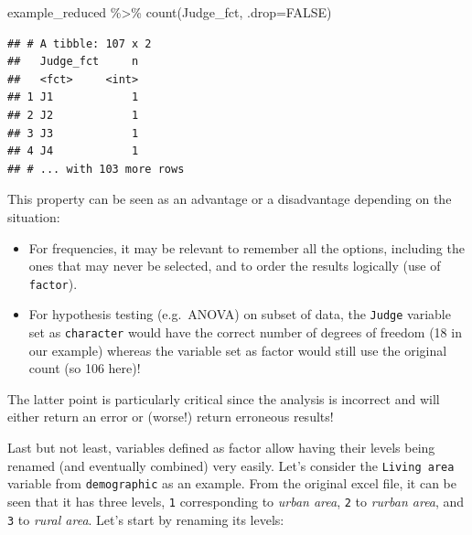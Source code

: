 \documentclass[
]{krantz}
\makeatletter
\newenvironment{Shaded}{\begin{snugshade}}{\end{snugshade}}
\newcommand{\AttributeTok}[1]{\textcolor[rgb]{0.61,0.61,0.61}{#1}}
\newcommand{\ConstantTok}[1]{\textcolor[rgb]{0,0,0}{#1}}
\newcommand{\DecValTok}[1]{\textcolor[rgb]{0.06,0.06,0.06}{#1}}
\newcommand{\FunctionTok}[1]{\textcolor[rgb]{0,0,0}{#1}}
\newcommand{\NormalTok}[1]{#1}
\newcommand{\OtherTok}[1]{\textcolor[rgb]{0.37,0.37,0.37}{#1}}
\newcommand{\SpecialCharTok}[1]{\textcolor[rgb]{0,0,0}{#1}}
\newcommand{\StringTok}[1]{\textcolor[rgb]{0.5,0.5,0.5}{#1}}
\providecommand{\tightlist}{%
  \setlength{\itemsep}{0pt}\setlength{\parskip}{0pt}}
\newenvironment{kframe}{%
\medskip{}
\setlength{\fboxsep}{.8em}
 \def\at@end@of@kframe{}%
 \ifinner\ifhmode%
  \def\at@end@of@kframe{\end{minipage}}%
  \begin{minipage}{\columnwidth}%
 \fi\fi%
 \def\FrameCommand##1{\hskip\@totalleftmargin \hskip-\fboxsep
 \colorbox{shadecolor}{##1}\hskip-\fboxsep
     \hskip-\linewidth \hskip-\@totalleftmargin \hskip\columnwidth}%
 \MakeFramed {\advance\hsize-\width
   \@totalleftmargin\z@ \linewidth\hsize
   \@setminipage}}%
 {\par\unskip\endMakeFramed%
 \at@end@of@kframe}
\renewenvironment{Shaded}{\begin{kframe}}{\end{kframe}}
\makeatother
\begin{document}
\begin{Shaded}
\begin{Highlighting}[]
\NormalTok{example\_reduced }\SpecialCharTok{\%\textgreater{}\%} 
  \FunctionTok{count}\NormalTok{(Judge\_fct, }\AttributeTok{.drop=}\ConstantTok{FALSE}\NormalTok{)}
\end{Highlighting}
\end{Shaded}

\begin{verbatim}
## # A tibble: 107 x 2
##   Judge_fct     n
##   <fct>     <int>
## 1 J1            1
## 2 J2            1
## 3 J3            1
## 4 J4            1
## # ... with 103 more rows
\end{verbatim}

This property can be seen as an advantage or a disadvantage depending on the situation:

\begin{itemize}
\tightlist
\item
  For frequencies, it may be relevant to remember all the options, including the ones that may never be selected, and to order the results logically (use of \texttt{factor}).
\item
  For hypothesis testing (e.g.~ANOVA) on subset of data, the \texttt{Judge} variable set as \texttt{character} would have the correct number of degrees of freedom (18 in our example) whereas the variable set as factor would still use the original count (so 106 here)!
\end{itemize}

The latter point is particularly critical since the analysis is incorrect and will either return an error or (worse!) return erroneous results!

Last but not least, variables defined as factor allow having their levels being renamed (and eventually combined) very easily.
Let's consider the \texttt{Living\ area} variable from \texttt{demographic} as an example. From the original excel file, it can be seen that it has three levels, \texttt{1} corresponding to \emph{urban area}, \texttt{2} to \emph{rurban area}, and \texttt{3} to \emph{rural area}. Let's start by renaming its levels:

\begin{Shaded}
\end{Shaded}
\end{document}
